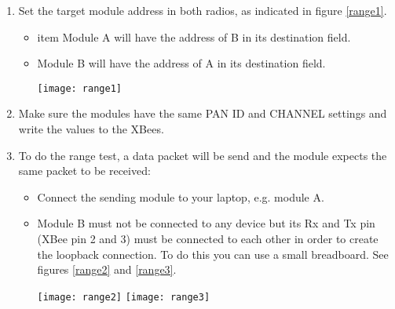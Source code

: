 \begin{enumerate}
    \item Set the target module address in both radios, as indicated in figure \ref{range1}.
    \begin{itemize} %
        \item item Module A will have the address of B in its destination field.\par
        \item Module B will have the address of A in its destination field. \par
        \begin{minipage}{\linewidth}
            \centering
            \texttt{[image: range1]}
            \label{range1}
        \end{minipage}
    \end{itemize}
    \item Make sure the modules have the same PAN ID and CHANNEL settings and write the values to the XBees.
    \item To do the range test, a data packet will be send and the module expects the same packet to be received:
	\begin{itemize}
		\item Connect the sending module to your laptop, e.g. module A. \par
		\item Module B must not be connected to any device but its Rx and Tx pin (XBee pin 2 and 3) must be connected to each other in order to create the loopback connection. To do this you can use a small breadboard. See figures \ref{range2} and \ref{range3}. \par
        \begin{minipage}{\linewidth}
            \centering
            \texttt{[image: range2]}
            \label{range2}
            \vspace{1cm}
            \texttt{[image: range3]}

\end{minipage}
\end{itemize}
\end{enumerate}
